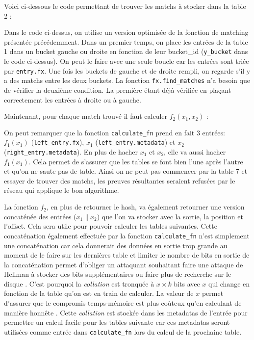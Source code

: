 Voici ci-dessous le code permettant de trouver les matchs à stocker dans la table 2 :


Dans le code ci-dessus, on utilise un version optimisée de la fonction de matching présentée précédemment. Dans un premier temps, on place les entrées de la table 1 dans un bucket gauche ou droite en fonction de leur bucket\_id (\verb|y_bucket| dans le code ci-dessus). On peut le faire avec une seule boucle car les entrées sont triée par \verb|entry.fx|. Une fois les buckets de gauche et de droite rempli, on regarde s'il y a des matchs entre les deux buckets. La fonction \verb|fx.find_matches| n'a besoin que de vérifier la deuxième condition. La première étant déjà vérifiée en plaçant correctement les entrées à droite ou à gauche.

Maintenant, pour chaque match trouvé il faut calculer $f_2(x_1,x_2)$ :


On peut remarquer que la fonction \verb|calculate_fn| prend en fait 3 entrées: $f_1(x_1)$ (\verb|left_entry.fx|), $x_1$ (\verb|left_entry.metadata|) et $x_2$ (\verb|right_entry.metadata|). En plus de hacher $x_1$ et $x_2$, elle va aussi hacher $f_1(x_1)$. Cela permet de s'assurer que les tables se font bien l'une après l'autre et qu'on ne saute pas de table. Ainsi on ne peut pas commencer par la table 7 et essayer de trouver des matchs, les preuves résultantes seraient refusées par le réseau qui applique le bon algorithme.

La fonction $f_2$, en plus de retourner le hash, va également retourner une version concaténée des entrées ($x_1\|x_2$) que l'on va stocker avec la sortie, la position et l'offset. Cela sera utile pour pouvoir calculer les tables suivantes. Cette concaténation également effectuée par la fonction \verb|calculate_fn| n'est simplement une concaténation car cela donnerait des données en sortie trop grande au moment de le faire sur les dernières table et limiter le nombre de bits en sortie de la concaténation permet d'obliger un attaquant souhaitant faire une attaque de Hellman à stocker des bits supplémentaires ou faire plus de recherche sur le disque \cite{chia:construction}. C'est pourquoi la \emph{collation} est tronquée à $x \times k$ bits avec $x$ qui change en fonction de la table qu'on est en train de calculer. La valeur de $x$ permet d'assurer que le compromis temps-mémoire est plus coûteux qu'en calculant de manière honnête \cite{chia:construction}. Cette \emph{collation} est stockée dans les metadatas de l'entrée pour permettre un calcul facile pour les tables suivante car ces metadatas seront utilisées comme entrée dans \verb|calculate_fn| lors du calcul de la prochaine table.

